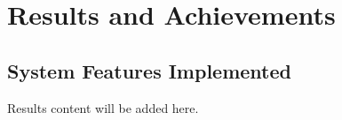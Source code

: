 \chapter{Results and Achievements}
\section{System Features Implemented}
Results content will be added here.
